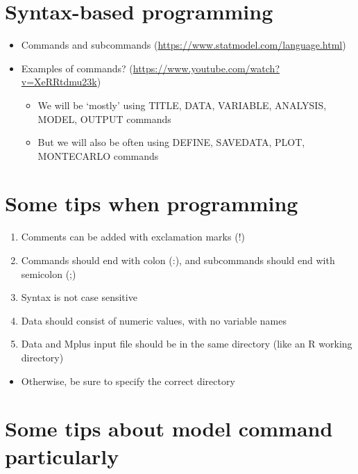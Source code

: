 \documentclass[
]{book}
\providecommand{\tightlist}{%
  \setlength{\itemsep}{0pt}\setlength{\parskip}{0pt}}
\begin{document}
\section{Syntax-based programming}\label{syntax-based-programming}

\begin{itemize}
\item
  Commands and subcommands (\url{https://www.statmodel.com/language.html})
\item
  Examples of commands? (\url{https://www.youtube.com/watch?v=XeRRtdmu23k})

  \begin{itemize}
  \tightlist
  \item
    We will be `mostly' using TITLE, DATA, VARIABLE, ANALYSIS, MODEL, OUTPUT commands
  \item
    But we will also be often using DEFINE, SAVEDATA, PLOT, MONTECARLO commands
  \end{itemize}
\end{itemize}

\section{Some tips when programming}\label{some-tips-when-programming}

\begin{enumerate}
\def\labelenumi{\arabic{enumi}.}
\item
  Comments can be added with exclamation marks (!)
\item
  Commands should end with colon (:), and subcommands should end with semicolon (;)
\item
  Syntax is not case sensitive
\item
  Data should consist of numeric values, with no variable names
\item
  Data and Mplus input file should be in the same directory (like an R working directory)
\end{enumerate}

\begin{itemize}
\tightlist
\item
  Otherwise, be sure to specify the correct directory
\end{itemize}

\section{Some tips about model command particularly}\label{some-tips-about-model-command-particularly}
\end{document}
